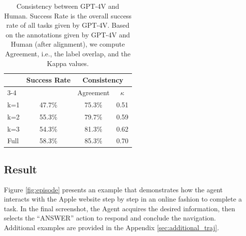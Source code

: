 \documentclass[11pt]{article}
\begin{document}
\begin{table}[t]
\small
\vspace{-0.1in}
\centering 
\begin{tabular}{@{}lccc@{}}
\toprule
\multirow{2}{*}{} & \multirow{2}{*}{Success Rate} & \multicolumn{2}{c}{Consistency} \\ \cmidrule(l){3-4} 
                  &                                       & Agreement        & $\kappa$        \\ \midrule
k=1               & 47.7\%                                & 75.3\%           & 0.51         \\
k=2               & 55.3\%                                & 79.7\%           & 0.59         \\
k=3               & 54.3\%                                & 81.3\%           & 0.62         \\
Full   & 58.3\%                                & 85.3\%           & 0.70         \\ \bottomrule
\end{tabular}
\caption{Consistency between GPT-4V and Human. Success Rate is the overall success rate of all tasks given by GPT-4V. Based on the annotations given by GPT-4V and Human (after alignment), we compute Agreement, i.e., the label overlap, and the Kappa values.}
\label{tab:consistency}
\end{table}



\subsection{Result}
Figure \ref{fig:episode} presents an example that demonstrates how the agent interacts with the Apple website step by step in an online fashion to complete a task. In the final screenshot, the Agent acquires the desired information, then selects the    ``ANSWER'' action to respond and conclude the navigation. 
Additional examples are provided in the Appendix \ref{sec:additional_traj}. 
\end{document}
